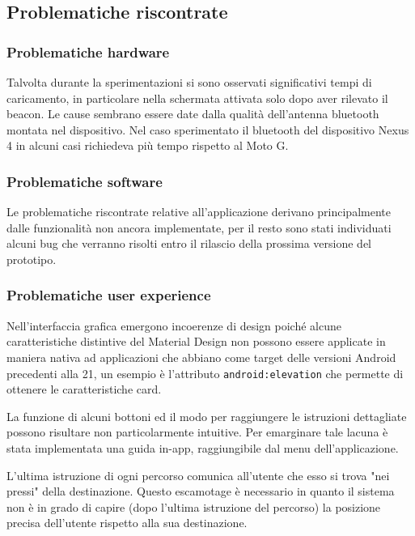 \documentclass[../Sperimentazione.tex]{subfiles}
\begin{document}
			
		\newpage
			
	
		\newpage
		\subsection{Problematiche riscontrate}
		
			\subsubsection{Problematiche hardware}
				Talvolta durante la sperimentazioni si sono osservati significativi tempi di caricamento, in particolare nella schermata attivata solo dopo aver rilevato il beacon. Le cause sembrano essere date dalla qualità dell'antenna bluetooth montata nel dispositivo. Nel caso sperimentato il bluetooth del dispositivo Nexus 4 in alcuni casi richiedeva più tempo rispetto al Moto G.
		
			\subsubsection{Problematiche software}
				Le problematiche riscontrate relative all'applicazione derivano principalmente dalle funzionalità non ancora implementate, per il resto sono stati individuati alcuni bug che verranno risolti entro il rilascio della prossima versione del prototipo.
		
			\subsubsection{Problematiche user experience}
				Nell'interfaccia grafica emergono incoerenze di design poiché alcune caratteristiche distintive del Material Design non possono essere applicate in maniera nativa ad applicazioni che abbiano come target delle versioni Android precedenti alla 21, un esempio è l'attributo \verb|android:elevation| che permette di ottenere le caratteristiche card.

La funzione di alcuni bottoni ed il modo per raggiungere le istruzioni dettagliate possono risultare non particolarmente intuitive. Per emarginare tale lacuna è stata implementata una guida in-app, raggiungibile dal menu dell'applicazione.
	
		L'ultima istruzione di ogni percorso comunica all'utente che esso si trova "nei pressi" della destinazione. Questo escamotage è necessario in quanto il sistema non è in grado di capire (dopo l'ultima istruzione del percorso) la posizione precisa dell'utente rispetto alla sua destinazione. 
			
\end{document}
